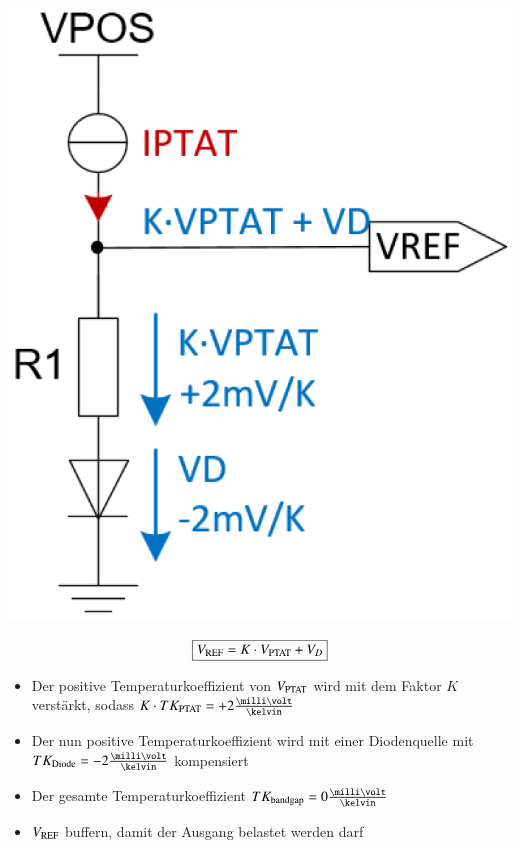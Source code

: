 \begin{minipage}[c]{0.2\columnwidth}
    \includegraphics[width=\columnwidth]{images/bandgap_referenz.png}
\end{minipage}
\hfill
\begin{minipage}[c]{0.78\columnwidth}
    $$ \boxed{ V_{\rm REF} = K \cdot V_{\rm PTAT} + V_D } $$
    \begin{itemize}
        \item Der positive Temperaturkoeffizient von $V_{\rm PTAT}$ wird mit dem Faktor $K$ verstärkt, sodass 
            $K \cdot TK_{\rm PTAT} = +2 \frac{\milli \volt}{\kelvin}$
        \item Der nun positive Temperaturkoeffizient wird mit einer Diodenquelle mit $TK_{\rm Diode} = -2 \frac{\milli \volt}{\kelvin}$
            kompensiert
        \item Der gesamte Temperaturkoeffizient $TK_{\rm bandgap} = 0 \frac{\milli \volt}{\kelvin}$
        \item $V_{\rm REF}$ buffern, damit der Ausgang belastet werden darf
    \end{itemize}
\end{minipage}


